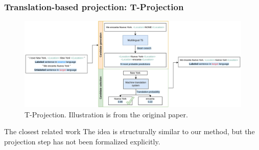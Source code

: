 \documentclass{beamer}
\begin{document}
\begin{frame}
  \frametitle{Translation-based projection: T-Projection}
  \begin{figure}
    \includegraphics[width=\textwidth]{T-Projection.png}
    \caption{T-Projection. Illustration is from the original paper.}
  \end{figure}

  \begin{alertblock}{The closest related work}
    The idea is structurally similar to our method,
    but the projection step has not been formalized explicitly.
  \end{alertblock}
\end{frame}
\end{document}

